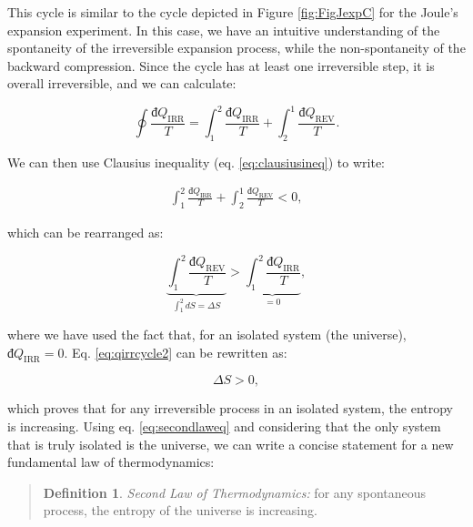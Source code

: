 \documentclass[
  9pt,
]{extbook}
\theoremstyle{definition}
\newtheorem{definition}{Definition}[chapter]
\theoremstyle{definition}
\theoremstyle{definition}
\theoremstyle{remark}
\begin{document}
This cycle is similar to the cycle depicted in Figure \ref{fig:FigJexpC} for the Joule's expansion experiment. In this case, we have an intuitive understanding of the spontaneity of the irreversible expansion process, while the non-spontaneity of the backward compression. Since the cycle has at least one irreversible step, it is overall irreversible, and we can calculate:

\begin{equation}
\oint \frac{đQ_{\mathrm{IRR}}}{T} = \int_1^2 \frac{đQ_{\mathrm{IRR}}}{T} + \int_2^1 \frac{đQ_{\mathrm{REV}}}{T}.
\label{eq:qirrcycle}
\end{equation}

We can then use Clausius inequality (eq. \eqref{eq:clausiusineq}) to write:

\begin{equation}
\begin{aligned}
\int_1^2 \frac{đQ_{\mathrm{IRR}}}{T} + \int_2^1 \frac{đQ_{\mathrm{REV}}}{T} < 0,
\end{aligned}
\label{eq:qirrcycle1}
\end{equation}

which can be rearranged as:

\begin{equation}
\underbrace{\int_1^2 \frac{đQ_{\mathrm{REV}}}{T}}_{\int_1^2 dS = \Delta S} > \underbrace{\int_1^2 \frac{đQ_{\mathrm{IRR}}}{T}}_{=0},
\label{eq:qirrcycle2}
\end{equation}

where we have used the fact that, for an isolated system (the universe), \(đQ_{\mathrm{IRR}}=0\). Eq. \eqref{eq:qirrcycle2} can be rewritten as:

\begin{equation}
\Delta S > 0,
\label{eq:secondlaweq}
\end{equation}

which proves that for any irreversible process in an isolated system, the entropy is increasing. Using eq. \eqref{eq:secondlaweq} and considering that the only system that is truly isolated is the universe, we can write a concise statement for a new fundamental law of thermodynamics:

\begin{quote}
\begin{definition}
\protect\hypertarget{def:secondlawdef}{}{\label{def:secondlawdef} }\emph{Second Law of Thermodynamics:} for any spontaneous process, the entropy of the universe is increasing.
\end{definition}
\end{quote}
\end{document}
